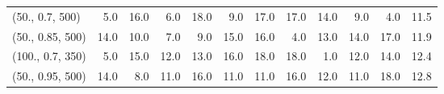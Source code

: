 \begin{table}
\begin{tabular}{lrrrrrrrrrrr}
(50., 0.7, 500)   &    5.0 &   16.0 &     6.0 &    18.0 &     9.0 &   17.0 &   17.0 &   14.0 &     9.0 &     4.0 &   11.5 \\
(50., 0.85, 500)  &   14.0 &   10.0 &     7.0 &     9.0 &    15.0 &   16.0 &    4.0 &   13.0 &    14.0 &    17.0 &   11.9 \\
(100., 0.7, 350)  &    5.0 &   15.0 &    12.0 &    13.0 &    16.0 &   18.0 &   18.0 &    1.0 &    12.0 &    14.0 &   12.4 \\
(50., 0.95, 500)  &   14.0 &    8.0 &    11.0 &    16.0 &    11.0 &   11.0 &   16.0 &   12.0 &    11.0 &    18.0 &   12.8 \\
\bottomrule
\end{tabular}
\end{table}
